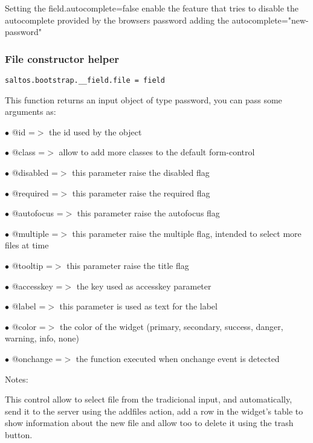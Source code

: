 \documentclass[a4paper]{article}
\begin{document}
Setting the field.autocomplete=false enable the feature that tries to disable the
autocomplete provided by the browsers password adding the autocomplete="new-password"

\hypertarget{toc627}{}
\subsubsection{File constructor helper}

\begin{lstlisting}
saltos.bootstrap.__field.file = field
\end{lstlisting}

This function returns an input object of type password, you can pass some arguments as:

\begin{compactitem}
\item[\color{myblue}$\bullet$] @id        =$>$ the id used by the object
\item[\color{myblue}$\bullet$] @class     =$>$ allow to add more classes to the default form-control
\item[\color{myblue}$\bullet$] @disabled  =$>$ this parameter raise the disabled flag
\item[\color{myblue}$\bullet$] @required  =$>$ this parameter raise the required flag
\item[\color{myblue}$\bullet$] @autofocus =$>$ this parameter raise the autofocus flag
\item[\color{myblue}$\bullet$] @multiple  =$>$ this parameter raise the multiple flag, intended to select more files at time
\item[\color{myblue}$\bullet$] @tooltip   =$>$ this parameter raise the title flag
\item[\color{myblue}$\bullet$] @accesskey =$>$ the key used as accesskey parameter
\item[\color{myblue}$\bullet$] @label     =$>$ this parameter is used as text for the label
\item[\color{myblue}$\bullet$] @color     =$>$ the color of the widget (primary, secondary, success, danger, warning, info, none)
\item[\color{myblue}$\bullet$] @onchange  =$>$ the function executed when onchange event is detected
\end{compactitem}

Notes:

This control allow to select file from the tradicional input, and automatically, send it
to the server using the addfiles action, add a row in the widget's table to show information
about the new file and allow too to delete it using the trash button.
\end{document}
